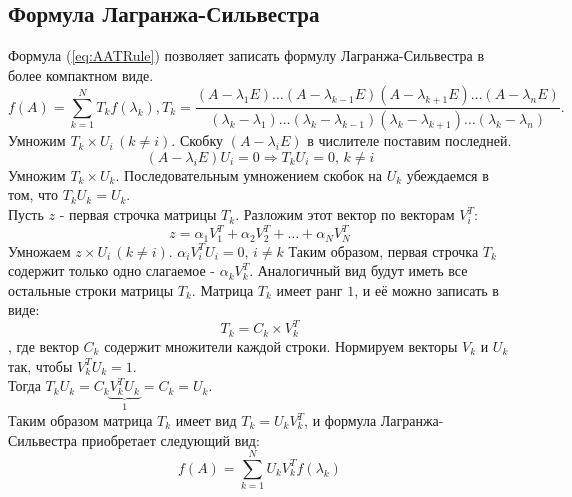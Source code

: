 \documentclass[a4paper,11pt]{article}
\begin{document}
  \subsection{Формула Лагранжа-Сильвестра}
  Формула (\ref{eq:AATRule}) позволяет записать формулу Лагранжа-Сильвестра в более компактном виде.
  \begin{equation*}
    f(A) = \sum_{k=1}^N T_kf(\lambda_k), T_k = \frac{(A-\lambda_1E)\dots(A-\lambda_{k-1}E)(A-\lambda_{k+1}E)\dots(A-\lambda_nE)}
                                               {(\lambda_k-\lambda_1)\dots(\lambda_k-\lambda_{k-1})(\lambda_k-\lambda_{k+1})\dots(\lambda_k-\lambda_n)}.
  \end{equation*}
  Умножим $T_k \times U_i \, (k \ne i)$. Скобку $(A - \lambda_iE)$ в числителе поставим последней.
  \[(A - \lambda_iE)U_i = 0 \Rightarrow T_kU_i = 0,\, k \ne i\]
  Умножим $T_k \times U_k$. Последовательным умножением скобок на $U_k$ убеждаемся в том, что $T_kU_k = U_k$. \\
  Пусть $z$ - первая строчка матрицы $T_k$. Разложим этот вектор по векторам $V_i^T$:
  \[z = \alpha_1V_1^T + \alpha_2V_2^T + \dots + \alpha_NV_N^T\]
  Умножаем $z \times U_i \, (k \ne i)$. $\alpha_iV_i^TU_i = 0,\, i \ne k$
  Таким образом, первая строчка $T_k$ содержит только одно слагаемое - $\alpha_kV_k^T$. Аналогичный вид будут иметь все остальные строки матрицы $T_k$.
    Матрица $T_k$ имеет ранг $1$, и её можно записать в виде:
  \[T_k = C_k \times V_k^T\]
  , где вектор $C_k$ содержит множители каждой строки. Нормируем векторы $V_k$ и $U_k$ так, чтобы $V_k^TU_k = 1$. \\
  Тогда $T_kU_k = C_k\underbrace{V_k^TU_k}_1 = C_k = U_k$. \\
  Таким образом матрица $T_k$ имеет вид $T_k = U_kV_k^T$, и формула Лагранжа-Сильвестра приобретает следующий вид:
  \[f(A) = \sum_{k=1}^N U_kV_k^T f(\lambda_k)\]
\end{document}
